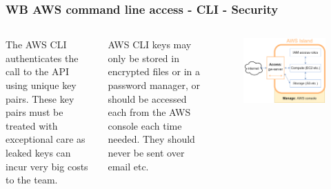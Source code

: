 \documentclass[aspectratio=169]{beamer} %
\begin{document}
\begin{frame}
	\frametitle{WB AWS command line access - CLI - Security}
	\begin{columns}[c]

		The AWS CLI authenticates the call to the API 
		using unique key pairs. 
		These key pairs must be treated with exceptional care as leaked keys can incur very big costs to the team.
		
		\vspace{.5cm} 
		
		AWS CLI keys may only be stored in 
		encrypted files or in a password manager, 
		or should be accessed each from 
		the AWS console each time needed.
		They should never be sent over email etc.
		
		\begin{figure}
			\centering
			\includegraphics[width=\textwidth]{./img/wb-aws.png}
		\end{figure}
		
	\end{columns}
\end{frame}
\end{document}
